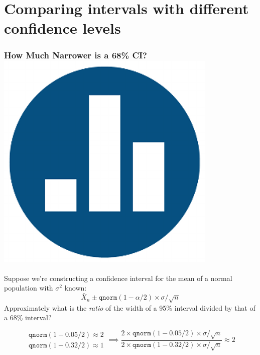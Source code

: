 \section{Comparing intervals with different confidence levels}
\begin{frame}
\frametitle{How Much Narrower is a 68\% CI? \hfill \includegraphics[scale = 0.05]{./images/clicker}}

Suppose we're constructing a confidence interval for the mean of a normal population with $\sigma^2$ known:
$$\bar{X}_n \pm \texttt{qnorm}(1 - \alpha /2) \times \sigma/\sqrt{n}$$
Approximately what is the \emph{ratio} of the width of a 95\% interval divided by that of a 68\% interval? 


\pause


\alert{$$
\boxed{\begin{array}{r}
	\texttt{qnorm}(1 - 0.05/2) \approx 2  \\
	\texttt{qnorm}(1 - 0.32/2)  \approx 1
\end{array}} \implies 
\frac{2 \times \texttt{qnorm}(1 - 0.05/2) \times \sigma/\sqrt{n}}{  2 \times \texttt{qnorm}(1 - 0.32/2) \times \sigma/\sqrt{n}}\approx 2
$$}

\end{frame}



